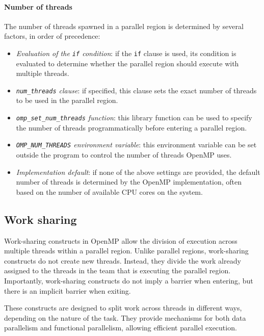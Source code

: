 \paragraph*{Number of threads}
The number of threads spawned in a parallel region is determined by several factors, in order of precedence:
\begin{itemize}
    \item \textit{Evaluation of the \texttt{if} condition}: if the \texttt{if} clause is used, its condition is evaluated to determine whether the parallel region should execute with multiple threads.
    \item \textit{\texttt{num\_threads} clause}: if specified, this clause sets the exact number of threads to be used in the parallel region.
    \item \textit{\texttt{omp\_set\_num\_threads} function}: this library function can be used to specify the number of threads programmatically before entering a parallel region.
    \item \textit{\texttt{OMP\_NUM\_THREADS} environment variable}: this environment variable can be set outside the program to control the number of threads OpenMP uses.
    \item \textit{Implementation default}: if none of the above settings are provided, the default number of threads is determined by the OpenMP implementation, often based on the number of available CPU cores on the system.
\end{itemize}

\subsection{Work sharing}
Work-sharing constructs in OpenMP allow the division of execution across multiple threads within a parallel region. 
Unlike parallel regions, work-sharing constructs do not create new threads. 
Instead, they divide the work already assigned to the threads in the team that is executing the parallel region. 
Importantly, work-sharing constructs do not imply a barrier when entering, but there is an implicit barrier when exiting.

These constructs are designed to split work across threads in different ways, depending on the nature of the task. 
They provide mechanisms for both data parallelism and functional parallelism, allowing efficient parallel execution.


